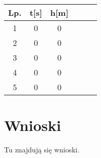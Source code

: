 \documentclass{article}
\begin{document}
\begin{center}
\begin{tabular}{ |c|c|c|c|c|c| } 
\hline
Lp. & t[s] & h[m] \\
\hline
1 & 0 & 0 \\ 
2 & 0 & 0 \\ 
3 & 0 & 0 \\ 
4 & 0 & 0 \\ 
5 & 0 & 0 \\ 
\hline
\end{tabular}
\end{center}

\maketitle
\section{Wnioski}
Tu znajdują się wnioski.
\end{document}
